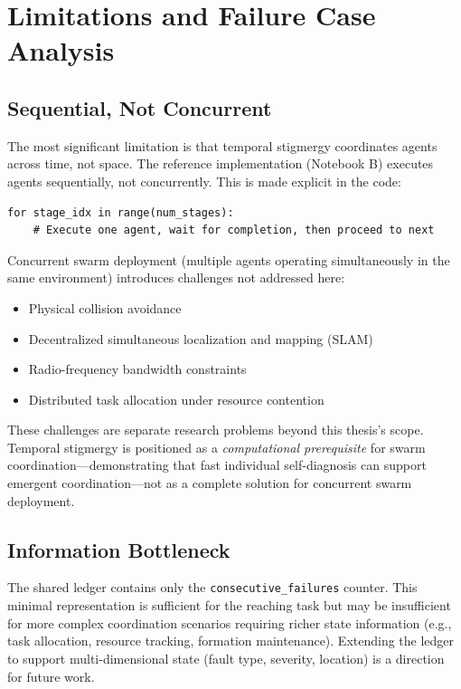 \documentclass[12pt,a4paper,oneside]{report}
\begin{document}
\section{Limitations and Failure Case Analysis}

\subsection{Sequential, Not Concurrent}

The most significant limitation is that temporal stigmergy coordinates agents across time, not space. The reference implementation (Notebook B) executes agents sequentially, not concurrently. This is made explicit in the code:

\begin{verbatim}
for stage_idx in range(num_stages):
    # Execute one agent, wait for completion, then proceed to next
\end{verbatim}

Concurrent swarm deployment (multiple agents operating simultaneously in the same environment) introduces challenges not addressed here:
\begin{itemize}
    \item Physical collision avoidance
    \item Decentralized simultaneous localization and mapping (SLAM)
    \item Radio-frequency bandwidth constraints
    \item Distributed task allocation under resource contention
\end{itemize}

These challenges are separate research problems beyond this thesis's scope. Temporal stigmergy is positioned as a \textit{computational prerequisite} for swarm coordination—demonstrating that fast individual self-diagnosis can support emergent coordination—not as a complete solution for concurrent swarm deployment.

\subsection{Information Bottleneck}

The shared ledger contains only the \texttt{consecutive\_failures} counter. This minimal representation is sufficient for the reaching task but may be insufficient for more complex coordination scenarios requiring richer state information (e.g., task allocation, resource tracking, formation maintenance). Extending the ledger to support multi-dimensional state (fault type, severity, location) is a direction for future work.
\end{document}
